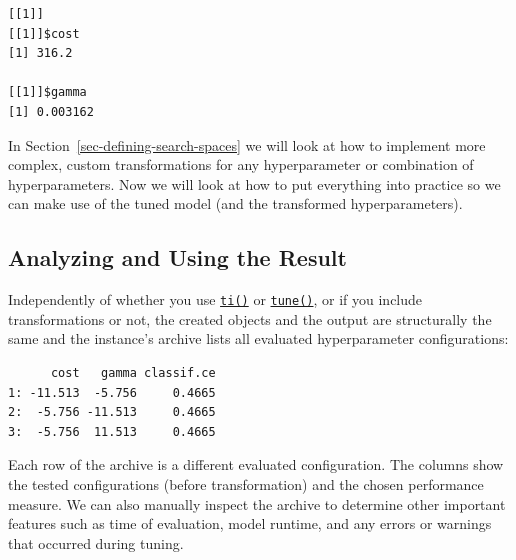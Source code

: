 \begin{verbatim}
[[1]]
[[1]]$cost
[1] 316.2

[[1]]$gamma
[1] 0.003162
\end{verbatim}

In Section~\ref{sec-defining-search-spaces} we will look at how to
implement more complex, custom transformations for any hyperparameter or
combination of hyperparameters. Now we will look at how to put
everything into practice so we can make use of the tuned model (and the
transformed hyperparameters).

\hypertarget{sec-analyzing-result}{%
\subsection{Analyzing and Using the Result}\label{sec-analyzing-result}}

Independently of whether you use
\href{https://mlr3tuning.mlr-org.com/reference/ti.html}{\texttt{ti()}}
or
\href{https://mlr3tuning.mlr-org.com/reference/tune.html}{\texttt{tune()}},
or if you include transformations or not, the created objects and the
output are structurally the same and the instance's archive lists all
evaluated hyperparameter configurations:

\begin{Shaded}
\begin{Highlighting}[]
\SpecialCharTok{$}\NormalTok{archive)[}\SpecialCharTok{:}\NormalTok{, .(cost, gamma, classif.ce)]}
\end{Highlighting}
\end{Shaded}

\begin{verbatim}
      cost   gamma classif.ce
1: -11.513  -5.756     0.4665
2:  -5.756 -11.513     0.4665
3:  -5.756  11.513     0.4665
\end{verbatim}

Each row of the archive is a different evaluated configuration. The
columns show the tested configurations (before transformation) and the
chosen performance measure. We can also manually inspect the archive to
determine other important features such as time of evaluation, model
runtime, and any errors or warnings that occurred during tuning.

\begin{Shaded}
\begin{Highlighting}[]
\SpecialCharTok{$}\NormalTok{archive)[}\SpecialCharTok{:}\NormalTok{,}
\NormalTok{  .(timestamp, runtime\_learners, errors, warnings)]}
\end{Highlighting}
\end{Shaded}

